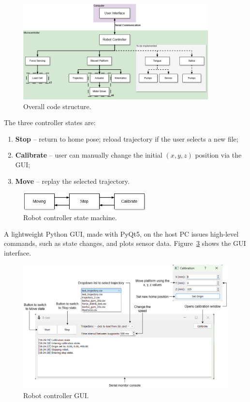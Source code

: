 \begin{figure}[H]
\centering
\includegraphics[width=0.9\textwidth]{figures/code_structure.drawio.png}
\caption{Overall code structure.}
\label{fig:code_structure}
\end{figure}

The three controller states are:
\begin{enumerate}
    \item \textbf{Stop} – return to home pose; reload trajectory if the user selects a new file;
    \item \textbf{Calibrate} – user can manually change the initial $(x,y,z)$ position via the GUI;
    \item \textbf{Move} – replay the selected trajectory.
\end{enumerate}

\begin{figure}[H]
\centering
\includegraphics[width=0.6\textwidth]{figures/state_machine.drawio.png}
\caption{Robot controller state machine.}
\label{fig:state_machine}
\end{figure}

A lightweight Python GUI, made with PyQt5, on the host PC issues high-level commands, such as state changes, and plots sensor data. Figure~\ref{fig:gui} shows the GUI interface. 

\begin{figure}[H]
  \centering
  \includegraphics[width=\textwidth]{figures/gui.drawio.png}
  \caption{Robot controller GUI.}
  \label{fig:gui}  
\end{figure}

